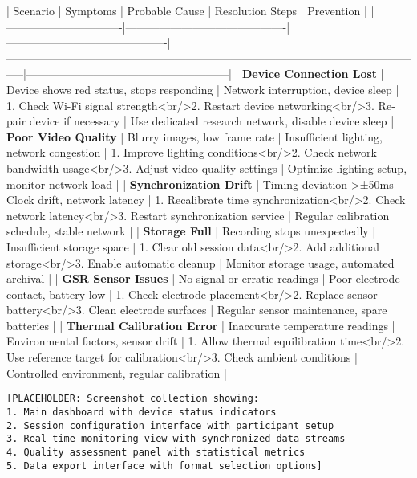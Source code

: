\documentclass[11pt,a4paper]{article}
\begin{document}
| Scenario                      | Symptoms                                  | Probable Cause                            | Resolution Steps                                                                                                | Prevention                                           |
|-------------------------------|-------------------------------------------|-------------------------------------------|-----------------------------------------------------------------------------------------------------------------|------------------------------------------------------|
| \textbf{Device Connection Lost}    | Device shows red status, stops responding | Network interruption, device sleep        | 1. Check Wi-Fi signal strength<br/>2. Restart device networking<br/>3. Re-pair device if necessary              | Use dedicated research network, disable device sleep |
| \textbf{Poor Video Quality}        | Blurry images, low frame rate             | Insufficient lighting, network congestion | 1. Improve lighting conditions<br/>2. Check network bandwidth usage<br/>3. Adjust video quality settings        | Optimize lighting setup, monitor network load        |
| \textbf{Synchronization Drift}     | Timing deviation >±50ms                   | Clock drift, network latency              | 1. Recalibrate time synchronization<br/>2. Check network latency<br/>3. Restart synchronization service         | Regular calibration schedule, stable network         |
| \textbf{Storage Full}              | Recording stops unexpectedly              | Insufficient storage space                | 1. Clear old session data<br/>2. Add additional storage<br/>3. Enable automatic cleanup                         | Monitor storage usage, automated archival            |
| \textbf{GSR Sensor Issues}         | No signal or erratic readings             | Poor electrode contact, battery low       | 1. Check electrode placement<br/>2. Replace sensor battery<br/>3. Clean electrode surfaces                      | Regular sensor maintenance, spare batteries          |
| \textbf{Thermal Calibration Error} | Inaccurate temperature readings           | Environmental factors, sensor drift       | 1. Allow thermal equilibration time<br/>2. Use reference target for calibration<br/>3. Check ambient conditions | Controlled environment, regular calibration          |

\begin{verbatim}
[PLACEHOLDER: Screenshot collection showing:
1. Main dashboard with device status indicators
2. Session configuration interface with participant setup
3. Real-time monitoring view with synchronized data streams
4. Quality assessment panel with statistical metrics
5. Data export interface with format selection options]
\end{verbatim}
\end{document}
